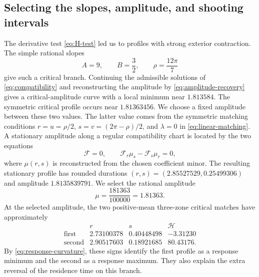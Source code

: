 \documentclass[11pt,a4paper]{article}
\begin{document}
\subsection{Selecting the slopes, amplitude, and shooting intervals}
The derivative test \eqref{eq:H-test} led us to profiles with strong
exterior contraction. The simple rational slopes
\[
 A=9,\qquad B=\frac32,\qquad \rho=\frac{12\pi}{7}
\]
give such a critical branch. Continuing the admissible solutions of
\eqref{eq:compatibility} and reconstructing the amplitude by
\eqref{eq:amplitude-recovery} gives a critical-amplitude curve with a
local minimum near $1.813584$. The symmetric critical profile occurs
near $1.81363456$. We choose a fixed amplitude between these two values.
The latter value comes from the symmetric matching conditions
$r=u=\rho/2$, $s=v=(2\pi-\rho)/2$, and $\lambda=0$ in
\eqref{eq:linear-matching}. A stationary amplitude along a regular
compatibility chart is located by the two equations
\[
 \mathcal F=0,\qquad
 \mathcal F_r\mu_s-\mathcal F_s\mu_r=0,
\]
where $\mu(r,s)$ is reconstructed from the chosen coefficient minor.
The resulting stationary profile has rounded durations
$(r,s)=(2.85527529,0.25499306)$ and amplitude $1.8135839791$.
We select the rational amplitude
\begin{equation}\label{eq:selected-amplitude}
 \mu=\frac{181363}{100000}=1.81363.
\end{equation}
At the selected amplitude, the two positive-mean three-zone critical
matches have approximately
\[
\begin{array}{c|rrr}
 &r&s&\mathcal H\\\hline
\text{first}&2.73100378&0.40448498&-3.31230\\
\text{second}&2.90517603&0.18921685&80.43176.
\end{array}
\]
By \eqref{eq:response-curvature}, these signs identify the first profile
as a response minimum and the second as a response maximum. They also
explain the extra reversal of the residence time on this branch.
\end{document}
